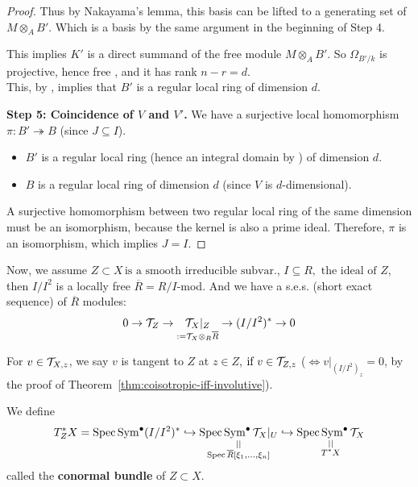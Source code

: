 \begin{proof}
    Thus by Nakayama's lemma, this basis can be lifted to a generating set of $M \otimes_A B'$.
    Which is a basis by the same argument in the beginning of Step 4.

    This implies $K'$ is a direct summand of the free module $M \otimes_A B'$. So $\Omega_{B'/k}$ is projective, hence free \cite[\href{https://stacks.math.columbia.edu/tag/00NX}{Tag 00NX}]{stacks-project}, and it has rank $n - r = d$.\\

    This, by \cite[Chap.~2.~Thm.~8.8.]{hartshorne1977algebraic}, implies that $B'$ is a regular local ring of dimension $d$.

    \textbf{Step 5: Coincidence of $V$ and $V'$.}
    We have a surjective local homomorphism $\pi: B' \twoheadrightarrow B$ (since $J \subseteq I$).
    \begin{itemize}
        \item $B'$ is a regular local ring (hence an integral domain by \cite[\href{https://stacks.math.columbia.edu/tag/00NP}{Tag 00NP}]{stacks-project}) of dimension $d$.
        \item $B$ is a regular local ring of dimension $d$ (since $V$ is $d$-dimensional).
    \end{itemize}
    A surjective homomorphism between two regular local ring of the same dimension must be an isomorphism, because the kernel is also a prime ideal.
    Therefore, $\pi$ is an isomorphism, which implies $J = I$.
\end{proof}

Now, we assume $Z \subset X\,\text{is a smooth irreducible subvar.}$, $I \subseteq R, \text{ the ideal of } Z$, then $I/I^2$ is a locally free $\overline{R} = R/I$-mod. And we have a s.e.s. (short exact sequence) of $\overline{R}$ modules:
\[
    0 \to \mathcal{T}_Z \to \underset{:= \mathcal{T}_X \otimes_R \overline{R}}{\mathcal{T}_X|_Z} \to (I/I^2)^{\ast} \to 0
\]

\noindent For $v \in \mathcal{T}_{X,z}$, we say $v$ is tangent to $Z$ at $z \in Z$, $\text{if } v \in \mathcal{T}_{Z,z}$ ($\iff v|_{(I/I^2)_z} = 0$, by the proof of Theorem~\ref{thm:coisotropic-iff-involutive}).

We define
\[
    T^{\ast}_Z X = \operatorname{Spec} \operatorname{Sym}^\bullet (I/I^2)^{\ast} \hookrightarrow \underset{\substack{\mid \mid \\ \operatorname{Spec} \overline{R}[\xi_1, \dots, \xi_n]}}{\operatorname{Spec} \operatorname{Sym}^\bullet \mathcal{T}_X|_U} \hookrightarrow \underset{\substack{\mid \mid \\ T^{\ast}X}}{\operatorname{Spec} \operatorname{Sym}^\bullet \mathcal{T}_X}
\]
called the \textbf{conormal bundle} of $Z \subset X$.

